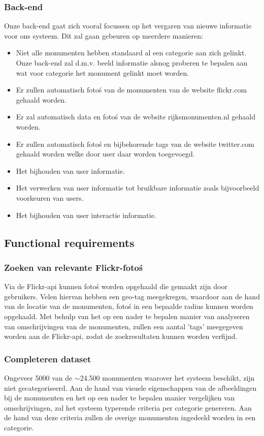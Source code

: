 \documentclass[a4paper,10pt]{article}
\begin{document}
		\subsubsection{Back-end}
			Onze back-end gaat zich vooral focussen op het vergaren van nieuwe informatie voor ons systeem. Dit zal gaan gebeuren op meerdere manieren:
			\begin{itemize}
				\item Niet alle monumenten hebben standaard al een categorie aan zich gelinkt. Onze back-end zal d.m.v. beeld informatie alsnog proberen te bepalen aan wat voor categorie het monument gelinkt moet worden.
				\item Er zullen automatisch foto\'s van de monumenten van de website flickr.com gehaald worden.
				\item Er zal automatisch data en foto\'s van de website rijksmonumenten.nl gehaald worden.
				\item Er zullen automatisch foto\'s en bijbehorende tags van de website twitter.com gehaald worden welke door user daar worden toegevoegd.
				\item Het bijhouden van user informatie.
				\item Het verwerken van user informatie tot bruikbare informatie zoals bijvoorbeeld voorkeuren van users.
				\item Het bijhouden van user interactie informatie.
			\end{itemize}
	
		\subsection{Functional requirements}
			\subsubsection{Zoeken van relevante Flickr-foto\'s}
			Via de Flickr-api kunnen foto\'s worden opgehaald die gemaakt zijn door gebruikers. Velen hiervan hebben een geo-tag meegekregen, waardoor aan de hand van de locatie van de monumenten, foto\'s in een bepaalde radius kunnen worden opgehaald. Met behulp van het op een nader te bepalen manier van analyseren van omschrijvingen van de monumenten, zullen een aantal 'tags' meegegeven worden aan de Flickr-api, zodat de zoekresultaten kunnen worden verfijnd.
			
			\subsubsection{Completeren dataset}
			Ongeveer 5000 van de $\sim$24.500 monumenten waarover het systeem beschikt, zijn niet gecategoriseerd. Aan de hand van visuele eigenschappen van de afbeeldingen bij de monumenten en het op een nader te bepalen manier vergelijken van omschrijvingen, zal het systeem typerende criteria per categorie genereren. Aan de hand van deze criteria zullen de overige monumenten ingedeeld worden in een categorie.
	
\end{document}
